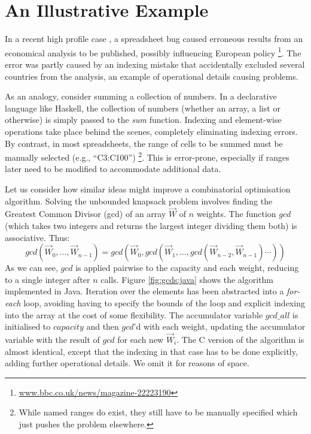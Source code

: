\section{An Illustrative Example}

In a recent high profile case \cite{Herndon13}, a spreadsheet bug caused
erroneous results from an economical analysis to be published, possibly
influencing European policy%
\footnote{\url{www.bbc.co.uk/news/magazine-22223190}}.
The error was partly caused by an indexing mistake that accidentally excluded
several countries from the analysis, an example of operational details causing
problems.

As an analogy, consider summing a collection of numbers. In a declarative
language like Haskell, the collection of numbers (whether an array, a list or
otherwise) is simply passed to the \emph{sum} function. Indexing and
element-wise operations take place behind the scenes, completely eliminating
indexing errors. By contrast, in most spreadsheets, the range of cells to
be summed must be manually selected (e.g., ``C3:C100'')%
\footnote{While named ranges do exist, they still have to be manually specified
which just pushes the problem elsewhere.}.
This is error-prone, especially if ranges later need to be modified to
accommodate additional data.

Let us consider how similar ideas might improve a combinatorial
optimisation algorithm. Solving the unbounded knapsack problem involves
finding the Greatest Common Divisor (gcd) of an array $\vec{W}$ of $n$
weights. The function $gcd$ (which takes two integers and returns the
largest integer dividing them both) is associative. Thus:
\[
gcd (\vec{W}_0, \ldots, \vec{W}_{n-1}) =
gcd(\vec{W}_0,gcd(\vec{W}_1, \ldots,gcd (\vec{W}_{n-2},\vec{W}_{n-1})\cdots))
\]
As we can see, $gcd$ is applied pairwise to the capacity and each weight,
reducing to a single integer after $n$ calls. Figure \ref{fig:gcds:java} shows
the algorithm implemented in Java. Iteration over the elements has been
abstracted into a \emph{for-each} loop, avoiding having to specify the bounds
of the loop and explicit indexing into the array at the cost of some
flexibility. The accumulator variable $gcd\_all$ is initialised to
$capacity$ and then $gcd$'d with each weight, updating the accumulator
variable with the result of $gcd$ for each new $\vec{W}_i$. The C version of
the algorithm is almost identical, except that the indexing in that case has
to be done explicitly, adding further operational details. We omit it for
reasons of space.

